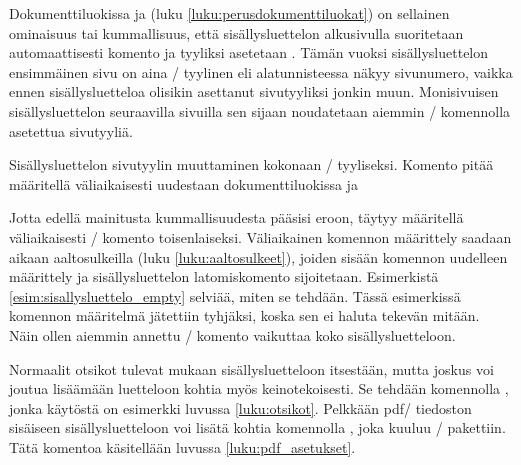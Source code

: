 Dokumenttiluokissa  ja  (luku
\ref{luku:perusdokumenttiluokat}) on sellainen ominaisuus tai
kummallisuus, että sisällysluettelon alkusivulla suoritetaan
automaattisesti komento  ja tyyliksi asetetaan
. Tämän vuoksi sisällysluettelon ensimmäinen sivu on aina
\-/ tyylinen eli alatunnisteessa näkyy sivunumero, vaikka
ennen sisällysluetteloa olisikin asettanut sivutyyliksi jonkin muun.
Monisivuisen sisällysluettelon seuraavilla sivuilla sen sijaan
noudatetaan aiemmin \-/ komennolla asetettua
sivutyyliä.

\begin{esimerkki*}

\begin{koodilohko}
  \pagestyle{empty}
  {
    \renewcommand{\thispagestyle}[1]{} %
    \tableofcontents
  }
\end{koodilohko}
\caption{Sisällysluettelon sivutyylin muuttaminen kokonaan
  \-/ tyyliseksi. Komento  pitää
  määritellä väliaikaisesti uudestaan dokumenttiluokissa 
  ja }
\label{esim:sisallysluettelo_empty}
\end{esimerkki*}

Jotta edellä mainitusta kummallisuudesta pääsisi eroon, täytyy
määritellä väliaikaisesti \-/ komento
toisenlaiseksi. Väliaikainen komennon määrittely saadaan aikaan
aaltosulkeilla (luku \ref{luku:aaltosulkeet}), joiden sisään komennon
uudelleen määrittely ja sisällysluettelon latomiskomento sijoitetaan.
Esimerkistä \ref{esim:sisallysluettelo_empty} selviää, miten se tehdään.
Tässä esimerkissä komennon määritelmä jätettiin tyhjäksi, koska sen ei
haluta tekevän mitään. Näin ollen aiemmin annettu \-/
komento vaikuttaa koko sisällysluetteloon.

Normaalit otsikot tulevat mukaan sisällysluetteloon itsestään, mutta
joskus voi joutua lisäämään luetteloon kohtia myös keinotekoisesti. Se
tehdään komennolla , jonka käytöstä on
esimerkki luvussa \ref{luku:otsikot}. Pelkkään pdf\-/ tiedoston
sisäiseen sisällysluetteloon voi lisätä kohtia komennolla
, joka kuuluu \-/ pakettiin.
Tätä komentoa käsitellään luvussa \ref{luku:pdf_asetukset}.

